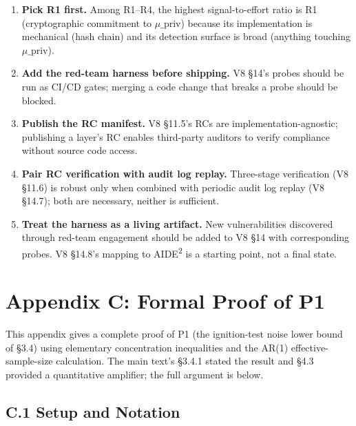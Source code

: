 \documentclass{article}
\theoremstyle{definition}
\begin{document}
\begin{enumerate}
    \item \textbf{Pick R1 first.} Among R1--R4, the highest signal-to-effort ratio is R1 (cryptographic commitment to $\mu\_{\text{priv}}$) because its implementation is mechanical (hash chain) and its detection surface is broad (anything touching $\mu\_{\text{priv}}$).
    \item \textbf{Add the red-team harness before shipping.} V8 \S14's probes should be run as CI/CD gates; merging a code change that breaks a probe should be blocked.
    \item \textbf{Publish the RC manifest.} V8 \S11.5's RCs are implementation-agnostic; publishing a layer's RC enables third-party auditors to verify compliance without source code access.
    \item \textbf{Pair RC verification with audit log replay.} Three-stage verification (V8 \S11.6) is robust only when combined with periodic audit log replay (V8 \S14.7); both are necessary, neither is sufficient.
    \item \textbf{Treat the harness as a living artifact.} New vulnerabilities discovered through red-team engagement should be added to V8 \S14 with corresponding probes. V8 \S14.8's mapping to AIDE\textsuperscript{2} is a starting point, not a final state.
\end{enumerate}



\section*{Appendix C: Formal Proof of P1}

This appendix gives a complete proof of P1 (the ignition-test noise lower bound of \S3.4) using elementary concentration inequalities and the AR(1) effective-sample-size calculation. The main text's \S3.4.1 stated the result and \S4.3 provided a quantitative amplifier; the full argument is below.

\subsection*{C.1 Setup and Notation}
\end{document}
